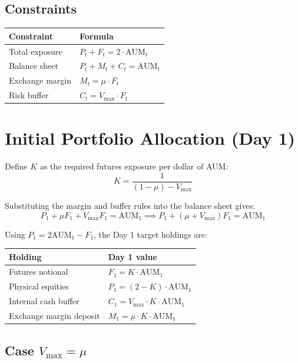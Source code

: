 \documentclass[11pt]{article}
\begin{document}
\subsection{Constraints}

\begin{center}
\begin{tabular}{@{}ll@{}}
\toprule
Constraint & Formula \\
\midrule
Total exposure & $P_t + F_t = 2 \cdot \mathrm{AUM}_t$ \\
Balance sheet & $P_t + M_t + C_t = \mathrm{AUM}_t$ \\
Exchange margin & $M_t = \mu \cdot F_t$ \\
Risk buffer & $C_t = V_{\mathrm{max}} \cdot F_t$ \\
\bottomrule
\end{tabular}
\end{center}

\section{Initial Portfolio Allocation (Day 1)}

Define $K$ as the required futures exposure per dollar of AUM:
\[
  K = \frac{1}{(1 - \mu) - V_{\mathrm{max}}}
\]

Substituting the margin and buffer rules into the balance sheet gives:
\[
  P_1 + \mu F_1 + V_{\mathrm{max}}F_1 = \mathrm{AUM}_1
  \implies P_1 + (\mu + V_{\mathrm{max}})F_1 = \mathrm{AUM}_1
\]

Using $P_1 = 2\mathrm{AUM}_1 - F_1$, the Day 1 target holdings are:

\begin{center}
\begin{tabular}{@{}ll@{}}
\toprule
Holding & Day 1 value \\
\midrule
Futures notional & $F_1 = K \cdot \mathrm{AUM}_1$ \\
Physical equities & $P_1 = (2 - K) \cdot \mathrm{AUM}_1$ \\
Internal cash buffer & $C_1 = V_{\mathrm{max}} \cdot K \cdot \mathrm{AUM}_1$ \\
Exchange margin deposit & $M_1 = \mu \cdot K \cdot \mathrm{AUM}_1$ \\
\bottomrule
\end{tabular}
\end{center}

\subsection{Case $V_{\mathrm{max}} = \mu$}
\end{document}
